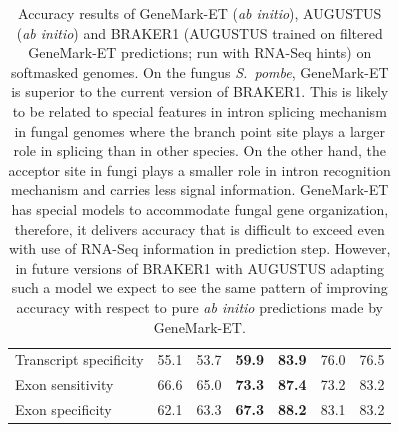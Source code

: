 \documentclass[a4paper,10pt]{report}
\begin{document}
\begin{table}
\begin{center}
\begin{scriptsize}
\begin{tabular}{|l|ccc|ccc|}
Transcript specificity & 55.1 & 53.7 &\textbf{ 59.9} & \textbf{83.9} & 76.0 & 76.5\\
Exon sensitivity       & 66.6 & 65.0 & \textbf{73.3} & \textbf{87.4} & 73.2 & 83.2\\
Exon specificity       & 62.1 & 63.3 & \textbf{67.3} & \textbf{88.2} & 83.1 & 83.2\\
\hline
 \end{tabular}
\end{scriptsize}
\end{center}
\caption{Accuracy results of GeneMark-ET (\textit{ab initio}), AUGUSTUS (\textit{ab initio}) and BRAKER1 (AUGUSTUS trained on filtered GeneMark-ET predictions; run with RNA-Seq hints) on softmasked genomes.
On the fungus \textit{S.~pombe}, GeneMark-ET is superior to the current version of BRAKER1. This is likely to be related to special features in intron splicing mechanism in fungal genomes where the branch point site plays a larger role in splicing than in other species. On the other hand, the acceptor site in fungi plays a smaller role in intron recognition mechanism and carries less signal information. GeneMark-ET has special models to accommodate fungal gene organization, therefore, it delivers accuracy that is difficult to exceed even with use of RNA-Seq information in prediction step. However, in future versions of BRAKER1 with AUGUSTUS adapting such a model we expect to see the same pattern of improving accuracy with respect to pure \textit{ab initio} predictions made by GeneMark-ET. \label{compare}}
\end{table}
\end{document}
